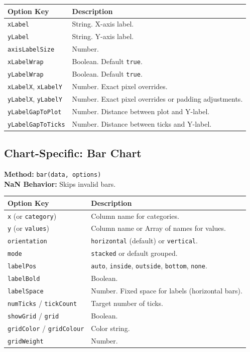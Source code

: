 \documentclass[10pt, a4paper]{article}
\begin{document}
\begin{longtable}{p{5cm} p{10cm}}
\toprule
\textbf{Option Key} & \textbf{Description} \\
\midrule
\texttt{xLabel} & String. X-axis label. \\
\texttt{yLabel} & String. Y-axis label. \\
\texttt{axisLabelSize} & Number. \\
\texttt{xLabelWrap} & Boolean. Default \texttt{true}. \\
\texttt{yLabelWrap} & Boolean. Default \texttt{true}. \\
\texttt{xLabelX}, \texttt{xLabelY} & Number. Exact pixel overrides. \\
\texttt{yLabelX}, \texttt{yLabelY} & Number. Exact pixel overrides or padding adjustments. \\
\texttt{yLabelGapToPlot} & Number. Distance between plot and Y-label. \\
\texttt{yLabelGapToTicks} & Number. Distance between ticks and Y-label. \\
\bottomrule
\end{longtable}

\subsection{Chart-Specific: Bar Chart}
\textbf{Method:} \texttt{bar(data, options)} \\
\textbf{NaN Behavior:} Skips invalid bars.

\begin{longtable}{p{5cm} p{10cm}}
\toprule
\textbf{Option Key} & \textbf{Description} \\
\midrule
\texttt{x} (or \texttt{category}) & Column name for categories. \\
\texttt{y} (or \texttt{values}) & Column name or Array of names for values. \\
\texttt{orientation} & \texttt{horizontal} (default) or \texttt{vertical}. \\
\texttt{mode} & \texttt{stacked} or default grouped. \\
\texttt{labelPos} & \texttt{auto}, \texttt{inside}, \texttt{outside}, \texttt{bottom}, \texttt{none}. \\
\texttt{labelBold} & Boolean. \\
\texttt{labelSpace} & Number. Fixed space for labels (horizontal bars). \\
\texttt{numTicks} / \texttt{tickCount} & Target number of ticks. \\
\texttt{showGrid} / \texttt{grid} & Boolean. \\
\texttt{gridColor} / \texttt{gridColour} & Color string. \\
\texttt{gridWeight} & Number. \\
\bottomrule
\end{longtable}
\end{document}
